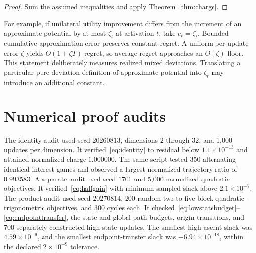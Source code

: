 \documentclass{article}
\begin{document}
\begin{proof}
Sum the assumed inequalities and apply Theorem~\ref{thm:charge}.
\end{proof}

For example, if unilateral utility improvement differs from the increment of an approximate potential by at most $\zeta_t$ at activation $t$, take $e_t=\zeta_t$. Bounded cumulative approximation error preserves constant regret. A uniform per-update error $\zeta$ yields $O(1+\zeta T)$ regret, so average regret approaches an $O(\zeta)$ floor. This statement deliberately measures realized mixed deviations. Translating a particular pure-deviation definition of approximate potential into $\zeta_t$ may introduce an additional constant.

\section{Numerical proof audits}
\label{app:numerics}

The identity audit used seed $20260813$, dimensions $2$ through $32$, and 1,000 updates per dimension. It verified~\eqref{eq:identity} to residual below $1.1\times10^{-13}$ and attained normalized charge $1.000000$. The same script tested 350 alternating identical-interest games and observed a largest normalized trajectory ratio of $0.993583$. A separate audit used seed $1701$ and 5,000 normalized quadratic objectives. It verified~\eqref{eq:halfgain} with minimum sampled slack above $2.1\times10^{-7}$. The product audit used seed $20270814$, 200 random two-to-five-block quadratic-trigonometric objectives, and 300 cycles each. It checked~\eqref{eq:lowstatebudget}--\eqref{eq:endpointtransfer}, the state and global path budgets, origin transitions, and 700 separately constructed high-state updates. The smallest high-ascent slack was $4.59\times10^{-9}$, and the smallest endpoint-transfer slack was $-6.94\times10^{-18}$, within the declared $2\times10^{-9}$ tolerance.
\end{document}
